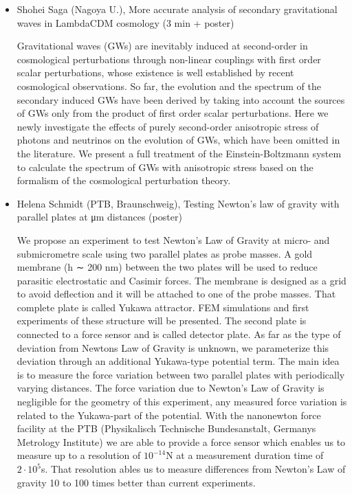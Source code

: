 \documentclass[letterpaper,12pt]{article}
\newcommand{\talk}[2]{{\fontspec{Lato Bold} #1,} {\fontspec{Lato Light Italic} #2}}
\begin{document}
\begin{itemize}
\item \talk{Shohei Saga (Nagoya U.)}{More accurate analysis of secondary gravitational waves in LambdaCDM cosmology (3 min + poster)}

Gravitational waves (GWs) are inevitably induced at second-order in cosmological perturbations through non-linear couplings with first order scalar perturbations, whose existence is well established by recent cosmological observations. So far, the evolution and the spectrum of the secondary induced GWs have been derived by taking into account the sources of GWs only from the product of first order scalar perturbations. Here we newly investigate the effects of purely second-order anisotropic stress of photons and neutrinos on the evolution of GWs, which have been omitted in the literature. We present a full treatment of the Einstein-Boltzmann system to calculate the spectrum of GWs with anisotropic stress based on the formalism of the cosmological perturbation theory.

\item \talk{Helena Schmidt (PTB, Braunschweig)}{Testing Newton's law of gravity with parallel plates at μm distances (poster)}

We propose an experiment to test Newton's Law of Gravity at micro- and submicrometre scale using two parallel plates as probe masses. A gold membrane (h ∼ 200 nm) between the two plates will be used to reduce parasitic electrostatic and Casimir forces. The membrane is designed as a grid to avoid deflection and it will be attached to one of the probe masses. That complete plate is called Yukawa attractor. FEM simulations and first experiments of these structure will be presented. The second plate is connected to a force sensor and is called detector plate. As far as the type of deviation from Newtons Law of Gravity is unknown, we parameterize this deviation through an additional Yukawa-type potential term. The main idea is to measure the force variation between two parallel plates with periodically varying distances. The force variation due to Newton's Law of Gravity is negligible for the geometry of this experiment, any measured force variation is related to the Yukawa-part of the potential. With the nanonewton force facility at the PTB (Physikalisch Technische Bundesanstalt, Germanys Metrology Institute) we are able to provide a force sensor which enables us to measure up to a resolution of $10^{-14}$N at a measurement duration time of $2·10^5$s. That resolution ables us to measure differences from Newton's Law of gravity 10 to 100 times better than current experiments.


\end{itemize}
\end{document}
